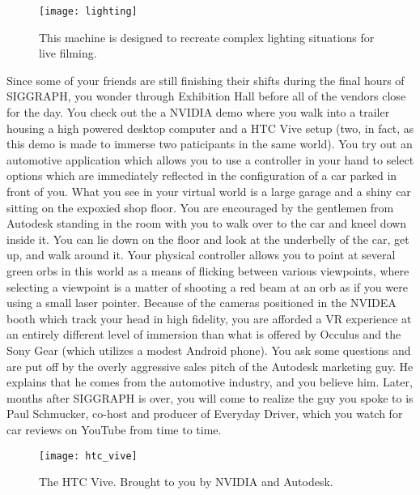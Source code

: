\documentclass[../main.tex]{subfiles}
\begin{document}
\begin{figure}[h!]
	\centering
	\texttt{[image: lighting]}
	\caption*{This machine is designed to recreate complex lighting situations for live filming.}
\end{figure}


Since some of your friends are still finishing their shifts during the final hours of SIGGRAPH, you wonder through Exhibition Hall before all of the vendors close for the day. You check out the a NVIDIA demo where you walk into a trailer housing a high powered desktop computer and a HTC Vive setup (two, in fact, as this demo is made to immerse two paticipants in the same world). You try out an automotive application which allows you to use a controller in your hand to select options which are immediately reflected in the configuration of a car parked in front of you. What you see in your virtual world is a large garage and a shiny car sitting on the expoxied shop floor. You are encouraged by the gentlemen from Autodesk standing in the room with you to walk over to the car and kneel down inside it. You can lie down on the floor and look at the underbelly of the car, get up, and walk around it. Your physical controller allows you to point at several green orbs in this world as a means of flicking between various viewpoints, where selecting a viewpoint is a matter of shooting a red beam at an orb as if you were using a small laser pointer. Because of the cameras positioned in the NVIDEA booth which track your head in high fidelity, you are afforded a VR experience at an entirely different level of immersion than what is offered by Occulus and the Sony Gear (which utilizes a modest Android phone). You ask some questions and are put off by the overly aggressive sales pitch of the Autodesk marketing guy. He explains that he comes from the automotive industry, and you believe him. Later, months after SIGGRAPH is over, you will come to realize the guy you spoke to is Paul Schmucker, co-host and producer of Everyday Driver, which you watch for car reviews on YouTube from time to time.

\begin{figure}[h!]
	\centering
	\texttt{[image: htc\_vive]}
	\caption*{The HTC Vive. Brought to you by NVIDIA and Autodesk.}
\end{figure}
\end{document}
